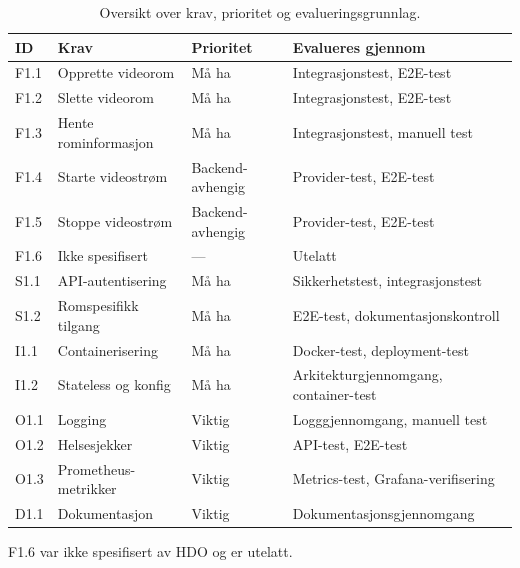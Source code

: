 \begin{table}[h]
\centering
\begin{threeparttable}
\caption{Oversikt over krav, prioritet og evalueringsgrunnlag.}
\label{tab:krav-oversikt}
\begin{tabular}{l l l l}
\toprule
\textbf{ID} & \textbf{Krav} & \textbf{Prioritet} & \textbf{Evalueres gjennom} \\
\midrule
F1.1 & Opprette videorom & Må ha & Integrasjonstest, E2E-test \\
F1.2 & Slette videorom & Må ha & Integrasjonstest, E2E-test \\
F1.3 & Hente rominformasjon & Må ha & Integrasjonstest, manuell test \\
F1.4 & Starte videostrøm & Backend-avhengig & Provider-test, E2E-test \\
F1.5 & Stoppe videostrøm & Backend-avhengig & Provider-test, E2E-test \\
F1.6 & Ikke spesifisert & --- & Utelatt \\
S1.1 & API-autentisering & Må ha & Sikkerhetstest, integrasjonstest \\
S1.2 & Romspesifikk tilgang & Må ha & E2E-test, dokumentasjonskontroll \\
I1.1 & Containerisering & Må ha & Docker-test, deployment-test \\
I1.2 & Stateless og konfig & Må ha & Arkitekturgjennomgang, container-test \\
O1.1 & Logging & Viktig & Logggjennomgang, manuell test \\
O1.2 & Helsesjekker & Viktig & API-test, E2E-test \\
O1.3 & Prometheus-metrikker & Viktig & Metrics-test, Grafana-verifisering \\
D1.1 & Dokumentasjon & Viktig & Dokumentasjonsgjennomgang \\
\bottomrule
\end{tabular}
\begin{tablenotes}
\footnotesize
\item F1.6 var ikke spesifisert av HDO og er utelatt.
\end{tablenotes}
\end{threeparttable}
\end{table}
\newpage

%





